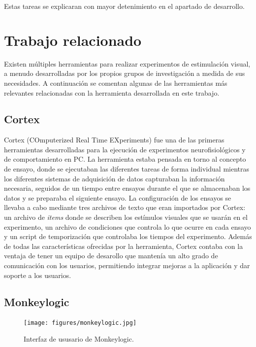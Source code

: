 \documentclass[conference]{IEEEtran}
\begin{document}
Estas tareas se explicaran con mayor detenimiento en el apartado de desarrollo.

\section{Trabajo relacionado}

Existen múltiples herramientas para realizar experimentos de estimulación visual, a menudo desarrolladas por los propios grupos de investigación a medida de sus necesidades. A continuación se comentan algunas de las herramientas más relevantes relacionadas con la herramienta desarrollada en este trabajo.

\subsection{Cortex}

Cortex (COmputerized Real Time EXperiments)\cite{cortex} fue una de las primeras herramientas desarrolladas para la ejecución de experimentos neurofisiológicos y de comportamiento en PC.
La herramienta estaba pensada en torno al concepto de ensayo, donde se ejecutaban las diferentes tareas de forma individual mientras los diferentes sistemas de adquisición de datos capturaban la información necesaria, seguidos de un tiempo entre ensayos durante el que se almacenaban los datos y se preparaba el siguiente ensayo. 
La configuración de los ensayos se llevaba a cabo mediante tres archivos de texto que eran importados por Cortex: un archivo de \textit{items} donde se describen los estímulos visuales que se usarán en el experimento, un archivo de condiciones que controla lo que ocurre en cada ensayo y un script de temporización que controlaba los tiempos del experimento. Además de todas las características ofrecidas por la herramienta, Cortex contaba con la ventaja de tener un equipo de desarollo que mantenía un alto grado de comunicación con los usuarios, permitiendo integrar mejoras a la aplicación y dar soporte a los usuarios.


\subsection{Monkeylogic}

\begin{figure}[tp]
\centerline{\texttt{[image: figures/monkeylogic.jpg]}}
\caption{Interfaz de ususario de Monkeylogic.}
\label{figMonkeyLogic}
\end{figure}
\end{document}
